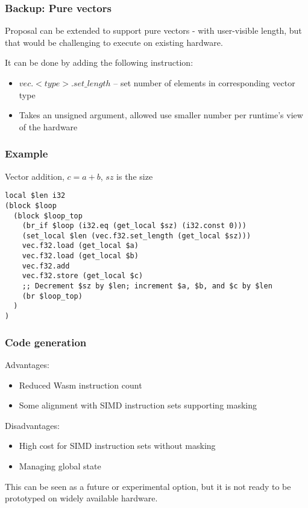 \documentclass[t,aspectratio=169, xcolor={table}]{beamer}
\begin{document}
\begin{frame}
\frametitle{Backup: Pure vectors}
  Proposal can be extended to support pure vectors - with user-visible length, but that would be challenging to execute on existing hardware.

  It can be done by adding the following instruction:

  \begin{itemize}
  \item $vec.<type>.set\_length$ -- set number of elements in corresponding vector type
  \item[] Takes an unsigned argument, allowed use smaller number per runtime's view of the hardware
  \end{itemize}
\end{frame}
\begin{frame}[containsverbatim]
\frametitle{Example}
Vector addition, $c = a + b$, $sz$ is the size
\begin{lstlisting}
local $len i32
(block $loop
  (block $loop_top
    (br_if $loop (i32.eq (get_local $sz) (i32.const 0)))
    (set_local $len (vec.f32.set_length (get_local $sz)))
    vec.f32.load (get_local $a)
    vec.f32.load (get_local $b)
    vec.f32.add
    vec.f32.store (get_local $c)
    ;; Decrement $sz by $len; increment $a, $b, and $c by $len
    (br $loop_top)
  )
)
\end{lstlisting}
\end{frame}
\begin{frame}
\frametitle{Code generation}
  Advantages:
  \begin{itemize}
  \item Reduced Wasm instruction count
  \item Some alignment with SIMD instruction sets supporting masking
  \end{itemize}
  Disadvantages:
  \begin{itemize}
  \item High cost for SIMD instruction sets without masking
  \item Managing global state 
  \end{itemize}
  This can be seen as a future or experimental option, but it is not ready to be prototyped on widely available hardware.
\end{frame}
\end{document}
